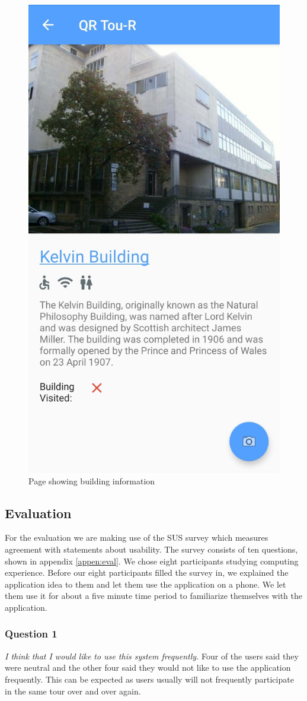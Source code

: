 \documentclass[a4,10pt,twocolumn]{article}
\begin{document}
\begin{figure}[!h]
    \centering
    \includegraphics[width=0.4\columnwidth]{app5.jpg}
    \caption{Page showing building information}
    \label{fig:appfinalmain}
\end{figure}

\newpage

\subsection{Evaluation}
For the evaluation we are making use of the SUS survey which measures agreement with statements about usability. The survey  consists of ten questions, shown in appendix \ref{appen:eval}. We chose eight participants studying computing experience. Before our eight participants filled the survey in, we explained the application idea to them and let them use the application on a phone. We let them use it for about a five minute time period to familiarize themselves with the application.

\subsubsection{Question 1}
\noindent\emph{I think that I would like to use this system frequently.}
\newline
\newline
Four of the users said they were neutral and the other four said they would not like to use the application frequently. This can be expected as users usually will not frequently participate in the same tour over and over again.
\end{document}

